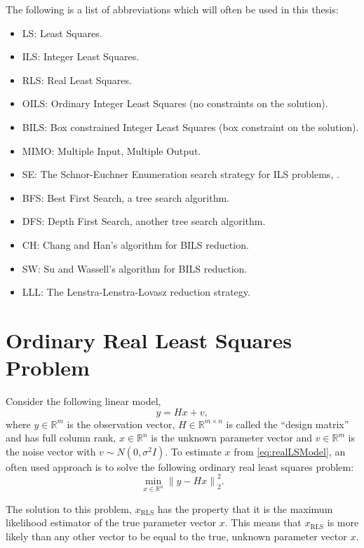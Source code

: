 \documentclass[12pt,Bold,letterpaper]{mcgilletdclass}
\newcommand{\be}{\begin{equation}}
\newcommand{\ee}{\end{equation}}
\begin{document}
The following is a list of abbreviations which will often be used in this thesis:
\begin{itemize}
\item LS: Least Squares.
\item ILS: Integer Least Squares.
\item RLS: Real Least Squares.
\item OILS: Ordinary Integer Least Squares (no constraints on the solution).
\item BILS: Box constrained Integer Least Squares (box constraint on the solution).
\item MIMO: Multiple Input, Multiple Output.
\item SE: The Schnor-Euchner Enumeration search strategy for ILS problems, \cite{SchE94}.
\item BFS: Best First Search, a tree search algorithm.
\item DFS: Depth First Search, another tree search algorithm.
\item CH: Chang and Han's algorithm for BILS reduction.
\item SW: Su and Wassell's algorithm for BILS reduction.
\item LLL: The Lenstra-Lenstra-Lovasz reduction strategy.
\end{itemize}

\section{Ordinary Real Least Squares Problem}
Consider the following linear model,
\begin{equation}
\label{eq:realLSModel}
y = Hx+v,
\end{equation}
where $y\in\mathbb{R}^m$ is the observation vector, $H\in\mathbb{R}^{m \times n}$ is called the
``design matrix'' and has full column rank, $x \in \mathbb{R}^n$ is the unknown parameter vector and $v \in \mathbb{R}^m$ is the noise vector with $v \sim N(0,\sigma^2I)$. To estimate $x$ from \eqref{eq:realLSModel}, an often used approach is to solve the following ordinary real least squares problem:
\be
\label{eq:realLSResidual}
	\min_{x \in \mathbb{R}^n} \left \| y- Hx \right \|^2_2.
\ee

The solution to this problem, $x_{\scriptscriptstyle{\mathrm{RLS}}}$ has the property that it is the maximum likelihood estimator of the true parameter vector $x$. This means that $x_{\scriptscriptstyle{\mathrm{RLS}}}$ is more likely than any other vector to be equal to the true, unknown parameter vector $x$. 
\end{document}
